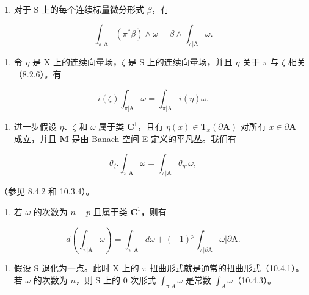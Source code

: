 \begin{enumerate}
\def\labelenumi{\alph{enumi})}
\tightlist
\item
  对于 S 上的每个连续标量微分形式 \(\beta\)，有
\end{enumerate}

\[
\int_ {\pi | \mathrm{A}} (\pi^ {*} \beta) \wedge \omega = \beta \wedge \int_ {\pi | \mathrm{A}} \omega .
\]

\begin{enumerate}
\def\labelenumi{\alph{enumi})}
\setcounter{enumi}{1}
\tightlist
\item
  令 \(\eta\) 是 X 上的连续向量场，\(\zeta\) 是 S 上的连续向量场，并且 \(\eta\) 关于 \(\pi\) 与 \(\zeta\) 相关（8.2.6）。有
\end{enumerate}

\[
i (\zeta) \int_ {\pi | \mathrm{A}} \omega = \int_ {\pi | \mathrm{A}} i (\eta) \omega .
\]

\begin{enumerate}
\def\labelenumi{\alph{enumi})}
\setcounter{enumi}{2}
\tightlist
\item
  进一步假设 \(\eta\)、\(\zeta\) 和 \(\omega\) 属于类 \(\mathbf{C}^1\)，且有 \(\eta(x) \in \mathrm{T}_x(\partial \mathbf{A})\) 对所有 \(x \in \partial \mathbf{A}\) 成立，并且 \(\mathbf{M}\) 是由 Banach 空间 E 定义的平凡丛。我们有
\end{enumerate}

\[
\theta_ {\zeta}. \int_ {\pi | \mathrm{A}} \omega = \int_ {\pi | \mathrm{A}} \theta_ {\eta}. \omega ,
\]

（参见 8.4.2 和 10.3.4）。

\begin{enumerate}
\def\labelenumi{\alph{enumi})}
\setcounter{enumi}{3}
\tightlist
\item
  若 \(\omega\) 的次数为 \(n + p\) 且属于类 \(\mathbf{C}^1\)，则有
\end{enumerate}

\[
d \left(\int_ {\pi | \mathrm{A}} \omega\right) = \int_ {\pi | \mathrm{A}} d \omega + (- 1) ^ {p} \int_ {\pi | \partial \mathrm{A}} \omega | \partial \mathrm{A}.
\]

\begin{enumerate}
\def\labelenumi{\alph{enumi})}
\setcounter{enumi}{4}
\tightlist
\item
  假设 S 退化为一点。此时 X 上的 \(\pi\)-扭曲形式就是通常的扭曲形式（10.4.1）。若 \(\omega\) 的次数为 \(n\)，则 S 上的 0 次形式 \(\int_{\pi|A} \omega\) 是常数 \(\int_{A} \omega\)（10.4.3）。
\end{enumerate}

